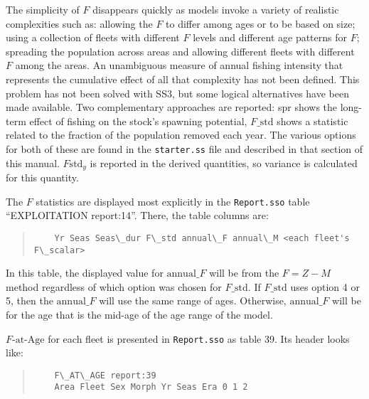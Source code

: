 The simplicity of $F$ disappears quickly as models invoke a variety of realistic complexities such as: allowing the $F$ to differ among ages or to be based on size; using a collection of fleets with different $F$ levels and different age patterns for $F$; spreading the population across areas and allowing different fleets with different $F$ among the areas. An unambiguous measure of annual fishing intensity that represents the cumulative effect of all that complexity has not been defined. This problem has not been solved with SS3, but some logical alternatives have been made available. Two complementary approaches are reported: \gls{spr} shows the long-term effect of fishing on the stock's spawning potential, $F\text{\_std}$ shows a statistic related to the fraction of the population removed each year. The various options for both of these are found in the \texttt{starter.ss} file and described in that section of this manual. $F\text{std}_y$ is reported in the derived quantities, so variance is calculated for this quantity.


The $F$ statistics are displayed most explicitly in the \texttt{Report.sso} table ``EXPLOITATION report:14''. There, the table columns are:
\begin{quote}
	\begin{verbatim}
	Yr Seas Seas\_dur F\_std annual\_F annual\_M <each fleet's F\_scalar>
	\end{verbatim}
\end{quote}

In this table, the displayed value for $\text{annual\_}F$ will be from the $F=Z-M$ method regardless of which option was chosen for $F\text{\_std}$. If $F\text{\_std}$ uses option 4 or 5, then the $\text{annual\_}F$ will use the same range of ages. Otherwise, $\text{annual\_}F$ will be for the age that is the mid-age of the age range of the model.

$F\text{-at-Age}$ for each fleet is presented in \texttt{Report.sso} as table 39. Its header looks like:
\begin{quote}
	\begin{verbatim}
	F\_AT\_AGE report:39
	Area Fleet Sex Morph Yr Seas Era 0 1 2
	\end{verbatim}
\end{quote}

